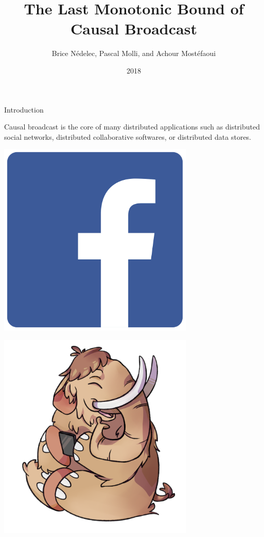 \documentclass[10pt, xcolor={usenames, dvipsnames}]{beamer}
\title{The Last Monotonic Bound of Causal Broadcast}
\author{Brice N\'edelec, Pascal Molli, and Achour Most{\'e}faoui}
\date{2018}
\institute{University of Nantes, LS2N}
\begin{document}
\maketitle

\begin{frame}{Introduction}

  Causal broadcast is the core of many distributed applications such as
  distributed social networks, distributed collaborative softwares, or
  distributed data stores.

  \vspace{3em}
  
    \begin{minipage}{0.19\textwidth}
      \centering
      \includegraphics[width=0.7\textwidth]{logos/facebook.png}
    \end{minipage}
    \begin{minipage}{0.19\textwidth}
      \centering
      \includegraphics[width=0.7\textwidth]{logos/mastodon.png}

\end{minipage}
\end{frame}
\end{document}
